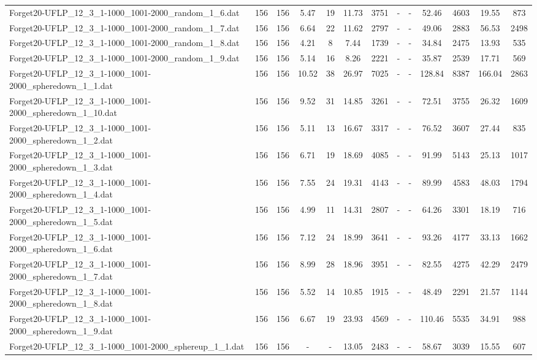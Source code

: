 \begin{table}[!ht]
{\begin{tabular}{lcccccccccccc}
Forget20-UFLP\_12\_3\_1-1000\_1001-2000\_random\_1\_6.dat & 156 & 156 & 5.47 & 19 & 11.73 & 3751 &  - &  - & 52.46 & 4603 & 19.55 & 873 \\
Forget20-UFLP\_12\_3\_1-1000\_1001-2000\_random\_1\_7.dat & 156 & 156 & 6.64 & 22 & 11.62 & 2797 &  - &  - & 49.06 & 2883 & 56.53 & 2498 \\
Forget20-UFLP\_12\_3\_1-1000\_1001-2000\_random\_1\_8.dat & 156 & 156 & 4.21 & 8 & 7.44 & 1739 &  - &  - & 34.84 & 2475 & 13.93 & 535 \\
Forget20-UFLP\_12\_3\_1-1000\_1001-2000\_random\_1\_9.dat & 156 & 156 & 5.14 & 16 & 8.26 & 2221 &  - &  - & 35.87 & 2539 & 17.71 & 569 \\
Forget20-UFLP\_12\_3\_1-1000\_1001-2000\_spheredown\_1\_1.dat & 156 & 156 & 10.52 & 38 & 26.97 & 7025 &  - &  - & 128.84 & 8387 & 166.04 & 2863 \\
Forget20-UFLP\_12\_3\_1-1000\_1001-2000\_spheredown\_1\_10.dat & 156 & 156 & 9.52 & 31 & 14.85 & 3261 &  - &  - & 72.51 & 3755 & 26.32 & 1609 \\
Forget20-UFLP\_12\_3\_1-1000\_1001-2000\_spheredown\_1\_2.dat & 156 & 156 & 5.11 & 13 & 16.67 & 3317 &  - &  - & 76.52 & 3607 & 27.44 & 835 \\
Forget20-UFLP\_12\_3\_1-1000\_1001-2000\_spheredown\_1\_3.dat & 156 & 156 & 6.71 & 19 & 18.69 & 4085 &  - &  - & 91.99 & 5143 & 25.13 & 1017 \\
Forget20-UFLP\_12\_3\_1-1000\_1001-2000\_spheredown\_1\_4.dat & 156 & 156 & 7.55 & 24 & 19.31 & 4143 &  - &  - & 89.99 & 4583 & 48.03 & 1794 \\
Forget20-UFLP\_12\_3\_1-1000\_1001-2000\_spheredown\_1\_5.dat & 156 & 156 & 4.99 & 11 & 14.31 & 2807 &  - &  - & 64.26 & 3301 & 18.19 & 716 \\
Forget20-UFLP\_12\_3\_1-1000\_1001-2000\_spheredown\_1\_6.dat & 156 & 156 & 7.12 & 24 & 18.99 & 3641 &  - &  - & 93.26 & 4177 & 33.13 & 1662 \\
Forget20-UFLP\_12\_3\_1-1000\_1001-2000\_spheredown\_1\_7.dat & 156 & 156 & 8.99 & 28 & 18.96 & 3951 &  - &  - & 82.55 & 4275 & 42.29 & 2479 \\
Forget20-UFLP\_12\_3\_1-1000\_1001-2000\_spheredown\_1\_8.dat & 156 & 156 & 5.52 & 14 & 10.85 & 1915 &  - &  - & 48.49 & 2291 & 21.57 & 1144 \\
Forget20-UFLP\_12\_3\_1-1000\_1001-2000\_spheredown\_1\_9.dat & 156 & 156 & 6.67 & 19 & 23.93 & 4569 &  - &  - & 110.46 & 5535 & 34.91 & 988 \\
Forget20-UFLP\_12\_3\_1-1000\_1001-2000\_sphereup\_1\_1.dat & 156 & 156 &  - &  - & 13.05 & 2483 &  - &  - & 58.67 & 3039 & 15.55 & 607 \\

\end{tabular}}
\end{table}
